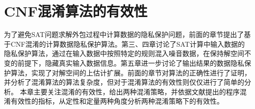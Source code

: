 \chapter{CNF混淆算法的有效性}
\label{chap:6}
为了避免SAT问题求解外包过程中计算数据的隐私保护问题，前面的章节提出了基于CNF混淆的计算数据隐私保护算法。第三、四章讨论了SAT计算中输入数据的隐私保护算法，通过在输入数据中按照特定的规则混入噪音数据，在保持解空间不变的前提下，隐藏真实输入数据信息。第五章进一步讨论了输出结果的数据隐私保护算法，实现了对解空间的上估计扩展。前面的章节对算法的正确性进行了证明，并分析了混淆算法的算法复杂度，但对于混淆算法的有效性则仅仅进行了简单的分析。
本章主要关注混淆的有效性，给出两种混淆策略，并依据文献\cite{obfuscationBible}提出的程序混淆有效性的指标，从定性和定量两种角度分析两种混淆策略下的有效性。
